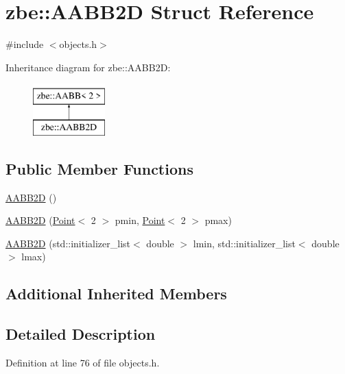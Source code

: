 \hypertarget{structzbe_1_1_a_a_b_b2_d}{}\section{zbe\+:\+:A\+A\+B\+B2\+D Struct Reference}
\label{structzbe_1_1_a_a_b_b2_d}


{\ttfamily \#include $<$objects.\+h$>$}

Inheritance diagram for zbe\+:\+:A\+A\+B\+B2\+D\+:\begin{figure}[H]
\begin{center}
\leavevmode
\includegraphics[height=2.000000cm]{structzbe_1_1_a_a_b_b2_d}
\end{center}
\end{figure}
\subsection*{Public Member Functions}
\begin{DoxyCompactItemize}
\item 
\hyperlink{structzbe_1_1_a_a_b_b2_d_a26a6ef5f3475f47bf4d92d6087a870ee}{A\+A\+B\+B2\+D} ()
\item 
\hyperlink{structzbe_1_1_a_a_b_b2_d_a07e6b3fc862c455a621c9743423c5ef2}{A\+A\+B\+B2\+D} (\hyperlink{classzbe_1_1_point}{Point}$<$ 2 $>$ pmin, \hyperlink{classzbe_1_1_point}{Point}$<$ 2 $>$ pmax)
\item 
\hyperlink{structzbe_1_1_a_a_b_b2_d_a5cc61bb61d08a3fc4f8100a6e7095084}{A\+A\+B\+B2\+D} (std\+::initializer\+\_\+list$<$ double $>$ lmin, std\+::initializer\+\_\+list$<$ double $>$ lmax)
\end{DoxyCompactItemize}
\subsection*{Additional Inherited Members}


\subsection{Detailed Description}


Definition at line 76 of file objects.\+h.



